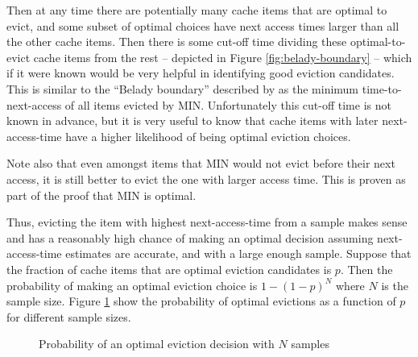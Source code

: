 Then at any time there are potentially many cache items that are optimal to evict, and some subset of optimal choices have next access times larger than all the other cache items. Then there is some cut-off time dividing these optimal-to-evict cache items from the rest -- depicted in Figure \ref{fig:belady-boundary} -- which if it were known would be very helpful in identifying good eviction candidates. This is similar to the ``Belady boundary'' described by \citet{relaxedBelady} as the minimum time-to-next-access of all items evicted by MIN. Unfortunately this cut-off time is not known in advance, but it is very useful to know that cache items with later next-access-time have a higher likelihood of being optimal eviction choices. 

Note also that even amongst items that MIN would not evict before their next access, it is still better to evict the one with larger access time. This is proven as part of the proof that MIN is optimal.~\cite{MINOptimality} %

Thus, evicting the item with highest next-access-time from a sample makes sense and has a reasonably high chance of making an optimal decision assuming next-access-time estimates are accurate, and with a large enough sample. Suppose that the fraction of cache items that are optimal eviction candidates is $p$. Then the probability of making an optimal eviction choice is $1-(1-p)^N$ where $N$ is the sample size. Figure \ref{plot:P-opt-eviction} show the probability of optimal evictions as a function of $p$ for different sample sizes.

\begin{figure}
    \centering
    \caption{Probability of an optimal eviction decision with $N$ samples}
    \label{plot:P-opt-eviction}
\end{figure}



